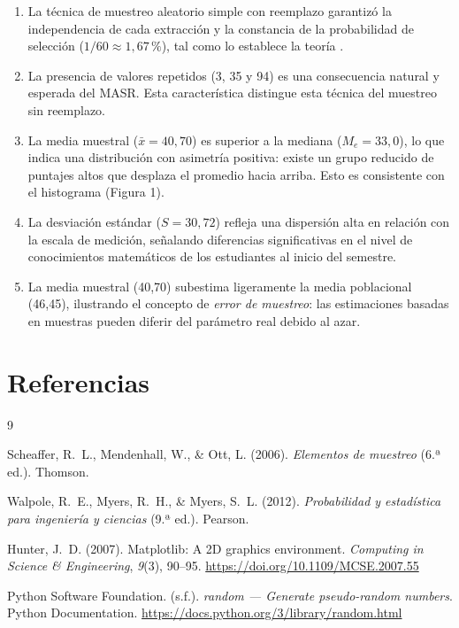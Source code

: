 \documentclass[12pt,a4paper]{article}
\begin{document}
\begin{enumerate}
  \item La técnica de muestreo aleatorio simple con reemplazo garantizó la independencia de
        cada extracción y la constancia de la probabilidad de selección
        ($1/60 \approx 1{,}67\,\%$), tal como lo establece la teoría \cite{scheaffer2006}.

  \item La presencia de valores repetidos (3, 35 y 94) es una consecuencia natural y esperada
        del MASR. Esta característica distingue esta técnica del muestreo sin reemplazo.

  \item La media muestral ($\bar{x} = 40{,}70$) es superior a la mediana ($M_e = 33{,}0$),
        lo que indica una distribución con asimetría positiva: existe un grupo reducido de
        puntajes altos que desplaza el promedio hacia arriba. Esto es consistente con el
        histograma (Figura 1).

  \item La desviación estándar ($S = 30{,}72$) refleja una dispersión alta en relación con la
        escala de medición, señalando diferencias significativas en el nivel de conocimientos
        matemáticos de los estudiantes al inicio del semestre.

  \item La media muestral (40,70) subestima ligeramente la media poblacional (46,45),
        ilustrando el concepto de \textit{error de muestreo}: las estimaciones basadas en
        muestras pueden diferir del parámetro real debido al azar.
\end{enumerate}

\section*{Referencias}

\begin{thebibliography}{9}

  Scheaffer, R.~L., Mendenhall, W., \& Ott, L. (2006).
  \textit{Elementos de muestreo} (6.ª ed.).
  Thomson.

  Walpole, R.~E., Myers, R.~H., \& Myers, S.~L. (2012).
  \textit{Probabilidad y estadística para ingeniería y ciencias} (9.ª ed.).
  Pearson.

  Hunter, J.~D. (2007).
  Matplotlib: A 2D graphics environment.
  \textit{Computing in Science \& Engineering}, \textit{9}(3), 90--95.
  \url{https://doi.org/10.1109/MCSE.2007.55}

  Python Software Foundation. (s.f.).
  \textit{random --- Generate pseudo-random numbers}.
  Python Documentation.
  \url{https://docs.python.org/3/library/random.html}

\end{thebibliography}
\end{document}
